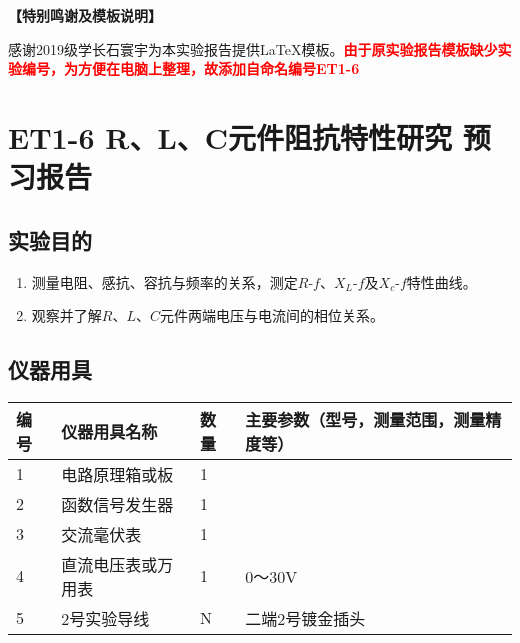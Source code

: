 \documentclass[dvipsnames, svgnames,a4paper,11pt]{article}
\begin{document}
	
	\textbf{【特别鸣谢及模板说明】}	
	
	感谢2019级学长石寰宇为本实验报告提供\LaTeX 模板。\textcolor{red}{\textbf{由于原实验报告模板缺少实验编号，为方便在电脑上整理，故添加自命名编号ET1-6}}
	
	
	
	\clearpage
	\tableofcontents
	\clearpage
	
	
	
	
	\setcounter{section}{0}
	\section{ET1-6 \quad R、L、C元件阻抗特性研究 \quad\heiti 预习报告}
	
	\subsection{实验目的}
	\begin{enumerate}
		\item 测量电阻、感抗、容抗与频率的关系，测定$R$-$f$、$X_L$-$f$及$X_c$-$f$特性曲线。
		\item 观察并了解$R$、$L$、$C$元件两端电压与电流间的相位关系。
		
	\end{enumerate}
	
	\subsection{仪器用具}
	\begin{table}[htbp]
		\centering
		\renewcommand\arraystretch{1.6}
		\begin{tabular}{p{}|p{}|p{}|p{}}
			\hline
			编号& 仪器用具名称 & 数量 &  主要参数（型号，测量范围，测量精度等） \\
			\hline
			1&  电路原理箱或板& 1 &  \\
			\hline
			2&  函数信号发生器& 1 &  \\
			\hline
			3&  交流毫伏表& 1 &  \\
			\hline
			4&  直流电压表或万用表& 1 & 0～30V \\
			\hline
			5&  2号实验导线& N & 二端2号镀金插头 \\
			\hline
		\end{tabular}
	\end{table}
	
\end{document}
